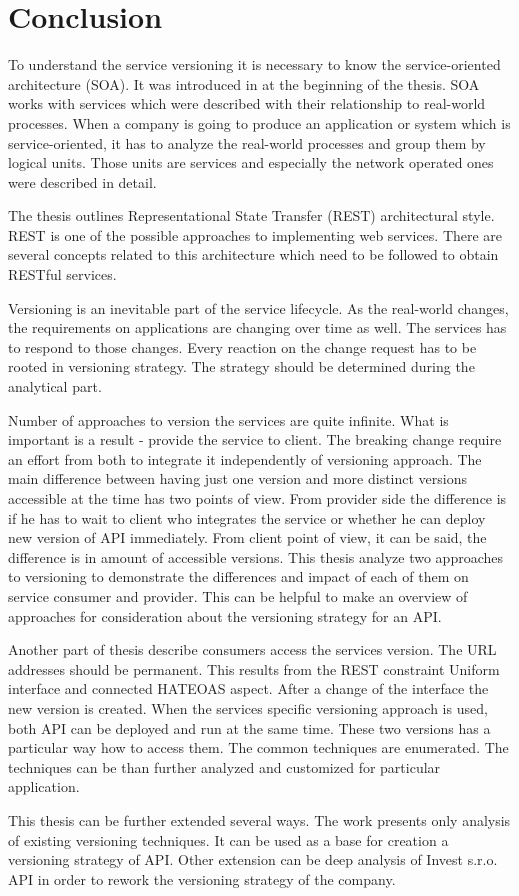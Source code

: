 \chapter{Conclusion}
\label{chap:conclusion}
To understand the service versioning it is necessary to know the service-oriented architecture (SOA). It was introduced in at the beginning of the thesis. SOA works with services which were described with their relationship to real-world processes. When a company is going to produce an application or system which is service-oriented, it has to analyze the real-world processes and group them by logical units. Those units are services and especially the network operated ones were described in detail.

The thesis outlines Representational State Transfer (REST) architectural style. REST is one of the possible approaches to implementing web services. There are several concepts related to this architecture which need to be followed to obtain RESTful services. 

Versioning is an inevitable part of the service lifecycle. As the real-world changes, the requirements on applications are changing over time as well. The services has to respond to those changes. Every reaction on the change request has to be rooted in versioning strategy. The strategy should be determined during the analytical part. 

Number of approaches to version the services are quite infinite. What is important is a result - provide the service to client. The breaking change require an effort from both to integrate it independently of versioning approach. The main difference between having just one version and more distinct versions accessible at the time has two points of view. From provider side the difference is if he has to wait to client who integrates the service or whether he can deploy new version of API immediately. From client point of view, it can be said, the difference is in amount of accessible versions. 
This thesis analyze two approaches to versioning to demonstrate the differences and impact of each of them on service consumer and provider. This can be helpful to make an overview of approaches for consideration about the versioning strategy for an API. 

Another part of thesis describe consumers access the services version. The URL addresses should be permanent. This results from the REST constraint Uniform interface and connected HATEOAS aspect. After a change of the interface the new version is created. When the services specific versioning approach is used, both API can be deployed and run at the same time. These two versions has a particular way how to access them. The common techniques are enumerated. The techniques can be than further analyzed and customized for particular application. 


This thesis can be further extended several ways. The work presents only analysis of existing versioning techniques. It can be used as a base for creation a versioning strategy of API. Other extension can be deep analysis of Invest s.r.o. API in order to rework the versioning strategy of the company.  


